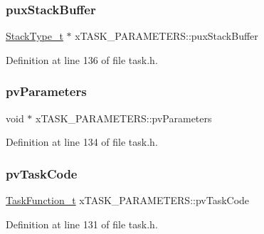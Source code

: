 \subsubsection{\texorpdfstring{pux\+Stack\+Buffer}{puxStackBuffer}}
{\footnotesize\ttfamily \hyperlink{externals_2freertos_2portable_2_g_c_c_2_a_r_m___c_m0_2portmacro_8h_a84e9a8ba132feed0b2401c1f4e2ac63c}{Stack\+Type\+\_\+t} $\ast$ x\+T\+A\+S\+K\+\_\+\+P\+A\+R\+A\+M\+E\+T\+E\+R\+S\+::pux\+Stack\+Buffer}



Definition at line 136 of file task.\+h.

\mbox{\label{structx_t_a_s_k___p_a_r_a_m_e_t_e_r_s_a0b116e4ace0d2dbce4267380ebe822fd}} 
\subsubsection{\texorpdfstring{pv\+Parameters}{pvParameters}}
{\footnotesize\ttfamily void $\ast$ x\+T\+A\+S\+K\+\_\+\+P\+A\+R\+A\+M\+E\+T\+E\+R\+S\+::pv\+Parameters}



Definition at line 134 of file task.\+h.

\mbox{\label{structx_t_a_s_k___p_a_r_a_m_e_t_e_r_s_a7527993402054565cda38251c8922880}} 
\subsubsection{\texorpdfstring{pv\+Task\+Code}{pvTaskCode}}
{\footnotesize\ttfamily \hyperlink{vendor_2ceedling_2plugins_2freertos_2vendor_2freertos_2include_2projdefs_8h_a9b32502ff92c255c686dacde53c1cba0}{Task\+Function\+\_\+t} x\+T\+A\+S\+K\+\_\+\+P\+A\+R\+A\+M\+E\+T\+E\+R\+S\+::pv\+Task\+Code}



Definition at line 131 of file task.\+h.


